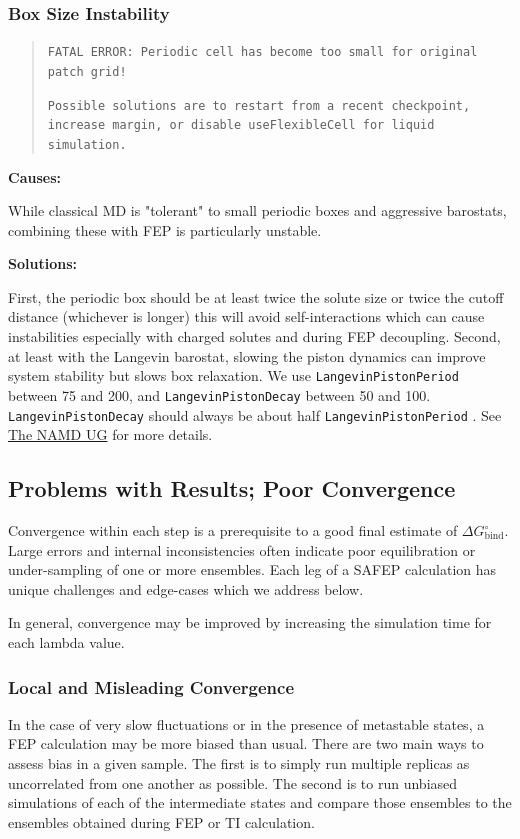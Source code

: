 \documentclass[9pt,tutorial]{Styling/livecoms}
\newcommand{\textInput}[1]{
  \texttt{#1}
}
\begin{document}
\subsubsection{Box Size Instability}
\begin{quote}
\texttt{FATAL ERROR: Periodic cell has become too small for original patch grid!}

\texttt{Possible solutions are to restart from a recent checkpoint,
increase margin, or disable useFlexibleCell for liquid simulation.}
\end{quote}

\noindent\textbf{Causes:}

While classical MD is "tolerant" to small periodic boxes and aggressive barostats, combining these with FEP is particularly unstable.

\noindent\textbf{Solutions:}

First, the periodic box should be at least twice the solute size or twice the cutoff distance (whichever is longer) this will avoid self-interactions which can cause instabilities especially with charged solutes and during FEP decoupling. Second, at least with the Langevin barostat, slowing the piston dynamics can improve system stability but slows box relaxation. We use \textInput{LangevinPistonPeriod} between 75 and 200, and \textInput{LangevinPistonDecay} between 50 and 100. \textInput{LangevinPistonDecay} should always be about half \textInput{LangevinPistonPeriod}. See \href{https://www.ks.uiuc.edu/Research/namd/2.14/ug/node39.html}{The NAMD UG} for more details. \cite{Bernardi2020}





\subsection{Problems with Results; Poor Convergence}

Convergence within each step is a prerequisite to a good final estimate of $\Delta G^\circ_\mathrm{bind}$. Large errors and internal inconsistencies often indicate poor equilibration or under-sampling of one or more ensembles. Each leg of a SAFEP calculation has unique challenges and edge-cases which we address below. 

In general, convergence may be improved by increasing the simulation time for each lambda value.

\subsubsection{Local and Misleading Convergence}
In the case of very slow fluctuations or in the presence of metastable states, a FEP calculation may be more biased than usual.
There are two main ways to assess bias in a given sample. 
The first is to simply run multiple replicas as uncorrelated from one another as possible. 
The second is to run unbiased simulations of each of the intermediate states and compare those ensembles to the ensembles obtained during FEP or TI calculation. 
\end{document}
